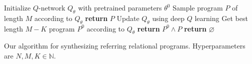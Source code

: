\begin{algorithm}[t]
\begin{algorithmic}
\STATE Initialize $Q$-network $Q_{\theta}$ with pretrained parameters $\theta^0$
\STATE Sample program $P$ of length $M$ according to $Q_{\theta}$
\STATE \textbf{return} $P$
\ENDIF
\STATE Update $Q_{\theta}$ using deep $Q$ learning
\ENDFOR
\STATE Get best length $M-K$ program $P^0$ according to $Q_{\theta}$
\STATE \textbf{return} $P^0\wedge P$
\ENDIF
\ENDFOR
\STATE \textbf{return} $\varnothing$
\ENDFUNCTION
\end{algorithmic}
\caption{Our algorithm for synthesizing referring relational programs. Hyperparameters are $N,M,K\in\mathbb{N}$.}
\label{alg:synth}
\end{algorithm}